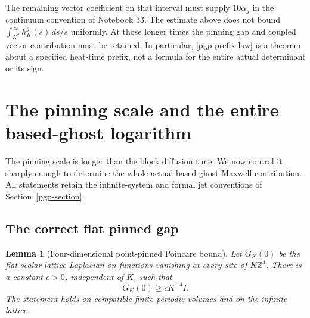 \documentclass[11pt]{article}
\newtheorem{lemma}[theorem]{Lemma}
\theoremstyle{remark}
\begin{document}
The remaining vector coefficient on that interval
must supply \(10\alpha_g\) in the continuum convention
of Notebook 33. The estimate above does not bound
\(\int_{K^2}^\infty h_K^g(s)\,ds/s\) uniformly.
At those longer times the pinning gap and coupled
vector contribution must be retained. In particular,
\eqref{pgp-prefix-law} is a theorem about a specified
heat-time prefix, not a formula for the entire actual
determinant or its sign.


\section{The pinning scale and the entire based-ghost logarithm}
\label{pgl-section}

The pinning scale is longer than the block diffusion
time. We now control it sharply enough to determine
the whole actual based-ghost Maxwell contribution.
All statements retain the infinite-system and formal
jet conventions of Section~\ref{pgp-section}.

\subsection{The correct flat pinned gap}
\label{pgl-gap-section}

\begin{lemma}[Four-dimensional point-pinned Poincare bound]
\label{pgl-gap}
Let \(G_K(0)\) be the flat scalar lattice Laplacian on
functions vanishing at every site of \(K\mathbb Z^4\).
There is a constant \(c>0\), independent of \(K\), such
that
\begin{equation}
                     G_K(0)\ge cK^{-4}I.
 \label{pgl-gap-bound}
\end{equation}
The statement holds on compatible finite periodic
volumes and on the infinite lattice.
\end{lemma}
\end{document}
